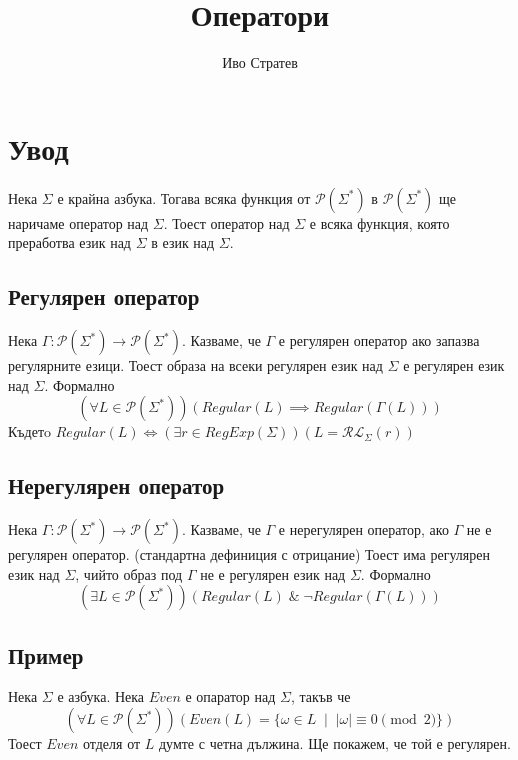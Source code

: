 \documentclass[12pt]{article}
\title{Оператори}
\author{Иво Стратев}
\begin{document}
\maketitle

\section*{Увод}
Нека \(\Sigma\) е крайна азбука. Тогава всяка функция от \(\mathcal{P}(\Sigma^*)\) в \(\mathcal{P}(\Sigma^*)\)
ще наричаме оператор над \(\Sigma\). Тоест оператор над \(\Sigma\) е всяка функция, която преработва език над \(\Sigma\) в език над \(\Sigma\).

\subsection*{Регулярен оператор}
Нека \(\Gamma : \mathcal{P}(\Sigma^*) \to \mathcal{P}(\Sigma^*)\).
Казваме, че \(\Gamma\) е регулярен оператор ако запазва регулярните езици.
Тоест образа на всеки регулярен език над \(\Sigma\) е регулярен език над \(\Sigma\).
Формално
\[(\forall L \in \mathcal{P}(\Sigma^*))(Regular(L) \implies Regular(\Gamma(L)) )\]
Къдетo \(Regular(L) \iff (\exists r \in RegExp(\Sigma))(L = \mathcal{RL}_\Sigma(r))\)

\subsection*{Нерегулярен оператор}
Нека \(\Gamma : \mathcal{P}(\Sigma^*) \to \mathcal{P}(\Sigma^*)\).
Казваме, че \(\Gamma\) е нерегулярен оператор, ако \(\Gamma\) не е регулярен оператор. (стандартна дефиниция с отрицание)
Тоест има регулярен език над \(\Sigma\), чийто образ под \(\Gamma\) не е регулярен език над \(\Sigma\).
Формално
\[(\exists L \in \mathcal{P}(\Sigma^*))(Regular(L) \;\&\; \lnot Regular(\Gamma(L)) )\]

\subsection*{Пример}
Нека \(\Sigma\) е азбука.
Нека \(Even\) е опаратор над \(\Sigma\), такъв че
\[(\forall L \in \mathcal{P}(\Sigma^*))(Even(L) = \{\omega \in L \; \mid \; |\omega| \equiv 0 \pmod{2}\})\]
Тоест \(Even\) отделя от \(L\) думте с четна дължина. Ще покажем, че той е регулярен.

\vspace*{5mm}
\end{document}
